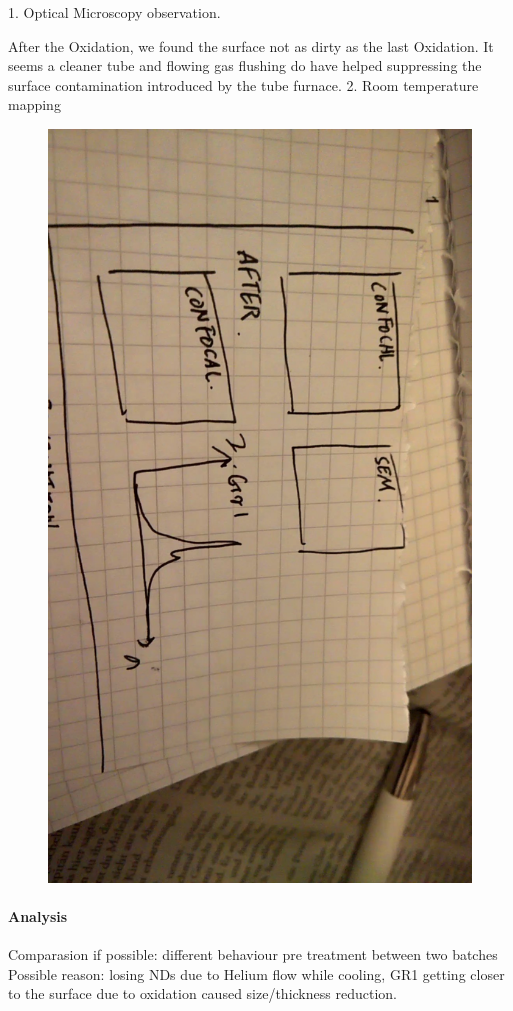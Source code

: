 1. Optical Microscopy observation. 

After the Oxidation, we found the surface not as dirty as the last Oxidation. It seems a cleaner tube and flowing gas flushing do have helped suppressing the surface contamination introduced by the tube furnace.
2. Room temperature mapping
\FloatBarrier
\begin{figure}[h]
\centering
\includegraphics[width=0.7\linewidth]{Figures/pic/WP_20160921_21_05_04_Moment}
\caption{}
\label{fig:wp20160921210504moment}
\end{figure}
\FloatBarrier



\paragraph{Analysis} 
Comparasion if possible: different behaviour pre treatment between two batches
Possible reason: losing NDs due to Helium flow while cooling, GR1 getting closer to the surface due to oxidation caused size/thickness reduction.

